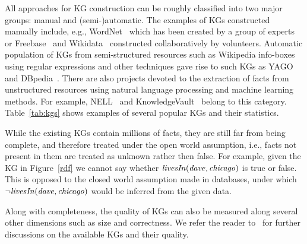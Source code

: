 
All approaches for KG construction can be roughly classified into two major groups: manual and (semi-)automatic. The examples of KGs constructed manually include, e.g., WordNet~\cite{wordnet} which has been created by a group of experts or Freebase~\cite{Freebase} and Wikidata~\cite{wikidata} constructed collaboratively by volunteers. 
Automatic population of KGs from semi-structured resources such as Wikipedia info-boxes using regular expressions and other techniques gave rise to such KGs as YAGO~\cite{yago} and DBpedia~\cite{dbpedia}. %
There are also projects %
devoted to the extraction of facts from unstructured resources using natural language processing and machine learning methods. %
For example, NELL~\cite{nell} and KnowledgeVault~\cite{KnowledgeVault} belong to this category. Table~\ref{tab:kgs} shows examples of several popular KGs and their statistics. %


While the existing KGs contain millions of facts, they are still far from being complete, and therefore treated under the open world assumption, i.e., facts not present in them are treated as unknown rather then false. For example, given the KG in Figure~\ref{rdf} we cannot say whether $\mathit{livesIn(dave,chicago)}$ is true or false. This is opposed to the closed world assumption made in databases, under which $\mathit{\neg livesIn(dave,chicago)}$ would be inferred from the given data.

Along with completeness, the quality of KGs can also be %
measured along several other dimensions such as size and correctness.  We refer the reader to~\cite{Nickel2015ARO,DBLP:journals/semweb/Paulheim17} for further discussions on the available KGs and their quality.




